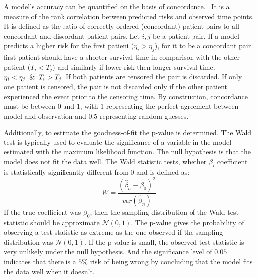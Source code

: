 A model's accuracy can be quantified on the basis of concordance.~\cite{therneau20201} 
It is a measure of the rank correlation between predicted risks and observed time points. 
It is defined as the ratio of correctly ordered (concordant) patient pairs to all concordant and discordant patient pairs.
Let $i, j$ be a patient pair. If a model predicts a higher risk for the first patient ($\eta_i > \eta_j$), for it to be a concordant pair first patient should have a shorter survival time in comparison with the other patient ($ T_i < T_j$) and similarly if lower risk then longer survival time, $\eta_i < \eta_j \And T_i > T_j$.
If both patients are censored the pair is discarded.
If only one patient is censored, the pair is not discarded only if the other patient experienced the event prior to the censoring time. By construction, concordance must be between $0$ and $1$, with $1$
representing the perfect agreement between model and
observation and $0.5$ representing random guesses.

Additionally, to estimate the goodness-of-fit the p-value is determined. The Wald test is typically used to evaluate the significance of a variable in the model estimated with the maximum likelihood function. The null hypothesis is that the model does not fit the data well. The Wald statistic tests, whether $\beta_i$ coefficient is statistically significantly different from $0$ and is defined as:
$$ W=\frac{(\hat{\beta}_n-\beta_0)^{2}}{var(\hat{\beta}_n)}$$
If the true coefficient was $\beta_0$, then the sampling distribution of
the Wald test statistic should be approximate $\mathcal{N} (0, 1)$. 
The p-value gives the probability of observing a test statistic as extreme as the one observed if the sampling distribution was $\mathcal{N} (0, 1)$. If the p-value is small, the observed test statistic is very
unlikely under the null hypothesis. And the significance level of $0.05$ indicates that there is a $5\%$ risk of being wrong by concluding that the model fits the data well when it doesn't.